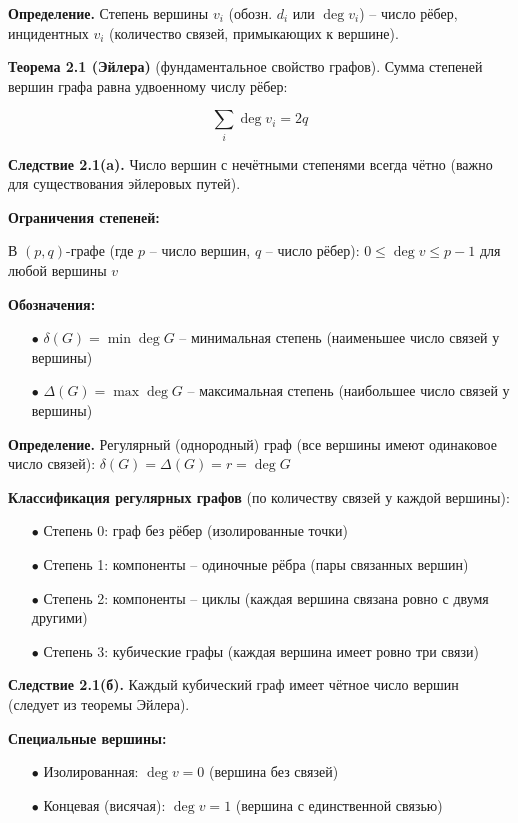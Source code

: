 \noindent\textbf{Определение.} Степень вершины $v_i$ (обозн. $d_i$ или $\deg v_i$) -- число рёбер, инцидентных $v_i$ (количество связей, примыкающих к вершине).

\noindent\textbf{Теорема 2.1 (Эйлера)} (фундаментальное свойство графов). Сумма степеней вершин графа равна удвоенному числу рёбер:

\[\sum_i \deg v_i = 2q\]

\noindent\textbf{Следствие 2.1(a).} Число вершин с нечётными степенями всегда чётно (важно для существования эйлеровых путей).

\noindent\textbf{Ограничения степеней:}

В $(p,q)$-графе (где $p$ -- число вершин, $q$ -- число рёбер): $0 \leq \deg v \leq p-1$ для любой вершины $v$

\noindent\textbf{Обозначения:}

\begin{itemize}

\item[$\bullet$] $\delta(G) = \min \deg G$ -- минимальная степень (наименьшее число связей у вершины)

\item[$\bullet$] $\Delta(G) = \max \deg G$ -- максимальная степень (наибольшее число связей у вершины)

\end{itemize}

\noindent\textbf{Определение.} Регулярный (однородный) граф (все вершины имеют одинаковое число связей): $\delta(G) = \Delta(G) = r = \deg G$

\noindent\textbf{Классификация регулярных графов} (по количеству связей у каждой вершины):

\begin{itemize}

\item[$\bullet$] Степень 0: граф без рёбер (изолированные точки)

\item[$\bullet$] Степень 1: компоненты -- одиночные рёбра (пары связанных вершин)

\item[$\bullet$] Степень 2: компоненты -- циклы (каждая вершина связана ровно с двумя другими)

\item[$\bullet$] Степень 3: кубические графы (каждая вершина имеет ровно три связи)

\end{itemize}

\noindent\textbf{Следствие 2.1(б).} Каждый кубический граф имеет чётное число вершин (следует из теоремы Эйлера).

\noindent\textbf{Специальные вершины:}

\begin{itemize}

\item[$\bullet$] Изолированная: $\deg v = 0$ (вершина без связей)

\item[$\bullet$] Концевая (висячая): $\deg v = 1$ (вершина с единственной связью)

\end{itemize}
